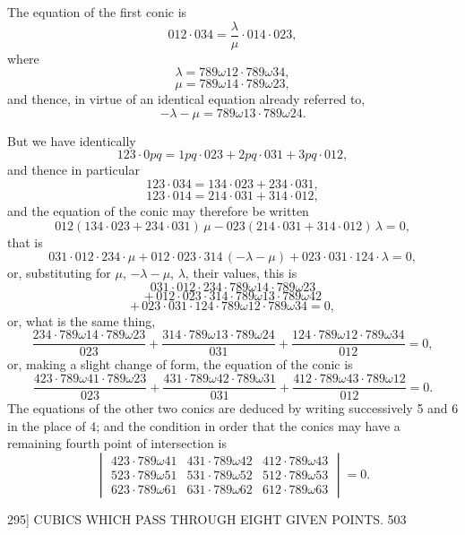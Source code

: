 \documentclass[11pt]{article}
\begin{document}
The equation of the first conic is
\[ 012\cdot 034 = \dfrac{\lambda}{\mu}\cdot 014\cdot 023, \]
where
\[ \lambda = 789\omega 12\cdot 789\omega 34, \]
\[ \mu = 789\omega 14\cdot 789\omega 23, \]
and thence, in virtue of an identical equation already referred to,
\[ -\lambda-\mu = 789\omega 13\cdot 789\omega 24. \]

But we have identically
\[ 123\cdot 0pq = 1pq\cdot 023+2pq\cdot 031+3pq\cdot 012, \]
and thence in particular
\[ 123\cdot 034 = 134\cdot 023+234\cdot 031, \]
\[ 123\cdot 014 = 214\cdot 031+314\cdot 012, \]
and the equation of the conic may therefore be written
\[ 012(134\cdot 023+234\cdot 031)\,\mu - 023(214\cdot 031+314\cdot 012)\,\lambda = 0, \]
that is
\[ 031\cdot 012\cdot 234\cdot\mu + 012\cdot 023\cdot 314\,(-\lambda-\mu) + 023\cdot 031\cdot 124\cdot\lambda = 0, \]
or, substituting for $\mu$, $-\lambda-\mu$, $\lambda$, their values, this is
\[ 031\cdot 012\cdot 234\cdot 789\omega 14\cdot 789\omega 23 \]
\[ +\,012\cdot 023\cdot 314\cdot 789\omega 13\cdot 789\omega 42 \]
\[ +\,023\cdot 031\cdot 124\cdot 789\omega 12\cdot 789\omega 34 = 0, \]
or, what is the same thing,
\[ \dfrac{234\cdot 789\omega 14\cdot 789\omega 23}{023} + \dfrac{314\cdot 789\omega 13\cdot 789\omega 24}{031} + \dfrac{124\cdot 789\omega 12\cdot 789\omega 34}{012} = 0, \]
or, making a slight change of form, the equation of the conic is
\[ \dfrac{423\cdot 789\omega 41\cdot 789\omega 23}{023} + \dfrac{431\cdot 789\omega 42\cdot 789\omega 31}{031} + \dfrac{412\cdot 789\omega 43\cdot 789\omega 12}{012} = 0. \]
The equations of the other two conics are deduced by writing successively 5 and 6
in the place of 4; and the condition in order that the conics may have a remaining
fourth point of intersection is
\[ \begin{vmatrix}
423\cdot 789\omega 41 & 431\cdot 789\omega 42 & 412\cdot 789\omega 43 \\
523\cdot 789\omega 51 & 531\cdot 789\omega 52 & 512\cdot 789\omega 53 \\
623\cdot 789\omega 61 & 631\cdot 789\omega 62 & 612\cdot 789\omega 63
\end{vmatrix} = 0. \]

\newpage
\begin{center}
\textsc{295]} \hfill CUBICS WHICH PASS THROUGH EIGHT GIVEN POINTS. \hfill 503
\end{center}
\end{document}
